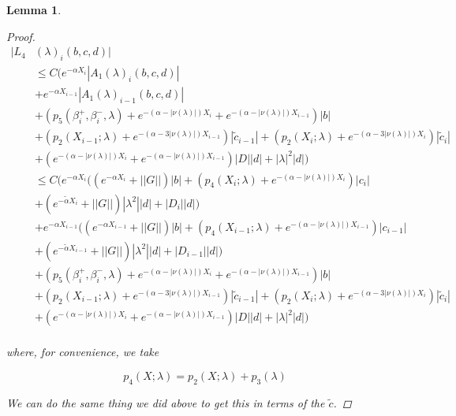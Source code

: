 \documentclass[12pt]{article}
\newtheorem{lemma}{Lemma}
\begin{document}
\begin{lemma}
\begin{proof}
\begin{align*}
|L_4&(\lambda)_i(b, c, d)|\\
&\leq C \Big( e^{-\alpha X_i} |A_1(\lambda)_i(b, c, d)| \\
&+  e^{-\alpha X_{i-1}} |A_1(\lambda)_{i-1}(b, c, d)| \\
&+ (p_5(\beta_i^+, \beta_i^-, \lambda) + e^{-(\alpha - |\nu(\lambda)|) X_i} + e^{-(\alpha - |\nu(\lambda)|) X_{i-1}}) |b| \\
&+ (p_2(X_{i-1}; \lambda) + e^{-(\alpha - 3 |\nu(\lambda)|) X_{i-1}}) |\tilde{c}_{i-1}| + (p_2(X_i; \lambda) + e^{-(\alpha - 3 |\nu(\lambda)|) X_i})|\tilde{c}_i| \\
&+ (e^{-(\alpha - |\nu(\lambda)|) X_i} + e^{-(\alpha - |\nu(\lambda)|) X_{i-1}})|D||d| + |\lambda|^2|d|
\Big) \\
&\leq C \Big( e^{-\alpha X_i} ( (e^{-\alpha X_i} + ||G||) |b| + ( p_4(X_i; \lambda) + e^{-(\alpha - |\nu(\lambda)|)X_i} )|c_i| \\
&+ (e^{-\tilde{\alpha} X_i} + ||G||) |\lambda^2| |d| + |D_i||d| ) \\
&+ e^{-\alpha X_{i-1}} ( (e^{-\alpha X_{i-1}} + ||G||) |b| + ( p_4(X_{i-1}; \lambda) + e^{-(\alpha - |\nu(\lambda)|)X_{i-1}} )|c_{i-1}| \\
&+ (e^{-\tilde{\alpha} X_{i-1}} + ||G||) |\lambda^2| |d| + |D_{i-1}||d| ) \\
&+ (p_5(\beta_i^+, \beta_i^-, \lambda) + e^{-(\alpha - |\nu(\lambda)|) X_i} + e^{-(\alpha - |\nu(\lambda)|) X_{i-1}}) |b| \\
&+ (p_2(X_{i-1}; \lambda) + e^{-(\alpha - 3 |\nu(\lambda)|) X_{i-1}}) |\tilde{c}_{i-1}| + (p_2(X_i; \lambda) + e^{-(\alpha - 3 |\nu(\lambda)|) X_i})|\tilde{c}_i| \\
&+ (e^{-(\alpha - |\nu(\lambda)|) X_i} + e^{-(\alpha - |\nu(\lambda)|) X_{i-1}})|D||d| + |\lambda|^2|d|
\Big) \\
\end{align*}

where, for convenience, we take

\begin{equation}
p_4(X; \lambda) = p_2(X; \lambda) + p_3(\lambda)
\end{equation}

We can do the same thing we did above to get this in terms of the $\tilde{c}$.


\end{proof}
\end{lemma}
\end{document}
